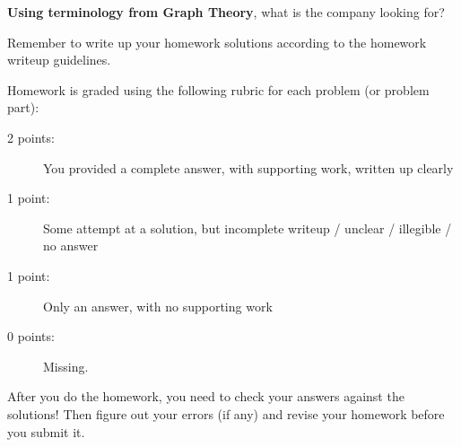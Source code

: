 \documentclass[11pt, oneside]{article}   	%
\begin{document}
\textbf{Using terminology from Graph Theory}, what is the company
looking for?

\hrulefill

Remember to write up your homework solutions according to the homework writeup guidelines. 

Homework is graded using the following rubric for each problem (or problem part):

\begin{description}
\item[2 points:] You provided a complete answer, with supporting work, written up clearly
\item[1 point:] Some attempt at a solution, but incomplete writeup / unclear / illegible / no answer
\item[1 point:] Only an answer, with no supporting work 
\item[0 points:] Missing.
\end{description}

After you do the homework, you need to check your answers against the solutions! Then figure out your errors (if any) and revise your homework before you submit it. 
\end{document}
